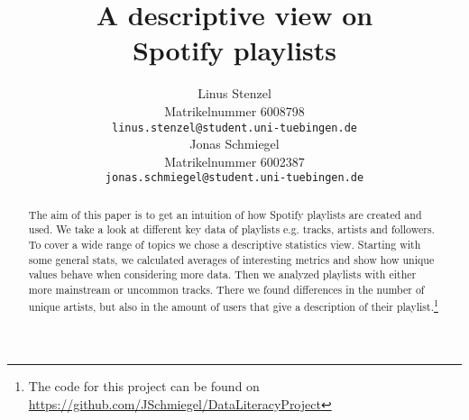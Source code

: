 \documentclass{article}
\title{A descriptive view on\\ Spotify playlists}
\author{
  Linus Stenzel\\
  Matrikelnummer 6008798\\
  \texttt{linus.stenzel@student.uni-tuebingen.de} \\
  \And
  Jonas Schmiegel\\
  Matrikelnummer 6002387\\
  \texttt{jonas.schmiegel@student.uni-tuebingen.de} \\
}
\begin{document}
\maketitle

\begin{abstract}
  The aim of this paper is to get an intuition of how Spotify playlists are created and used. We take a look at different key data of playlists e.g. tracks, artists and followers. To cover a wide range of topics we chose a descriptive statistics view. Starting with some general stats, we calculated averages of interesting metrics and show how unique values behave when considering more data. Then we analyzed playlists with either more mainstream or uncommon tracks. There we found differences in the number of unique artists, but also in the amount of users that give a description of their playlist.\footnote{The code for this project can be found on \url{https://github.com/JSchmiegel/DataLiteracyProject}}
\end{abstract}









\end{document}
